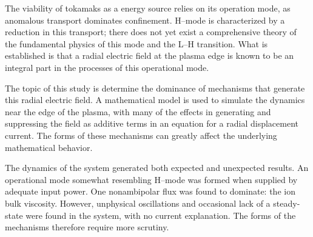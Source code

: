 
The viability of tokamaks as a energy source relies on its operation mode, as anomalous transport dominates confinement.
H--mode is characterized by a reduction in this transport; there does not yet exist a comprehensive theory of the fundamental physics of this mode and the L--H transition.
What is established is that a radial electric field at the plasma edge is known to be an integral part in the processes of this operational mode.

The topic of this study is determine the dominance of mechanisms that generate this radial electric field.
A mathematical model is used to simulate the dynamics near the edge of the plasma, with many of the effects in generating and suppressing the field as additive terms in an equation for a radial displacement current.
The forms of these mechanisms can greatly affect the underlying mathematical behavior.

The dynamics of the system generated both expected and unexpected results.
An operational mode somewhat resembling H--mode was formed when supplied by adequate input power.
One nonambipolar flux was found to dominate: the ion bulk viscosity.
However, unphysical oscillations and occasional lack of a steady-state were found in the system, with no current explanation.
The forms of the mechanisms therefore require more scrutiny.

